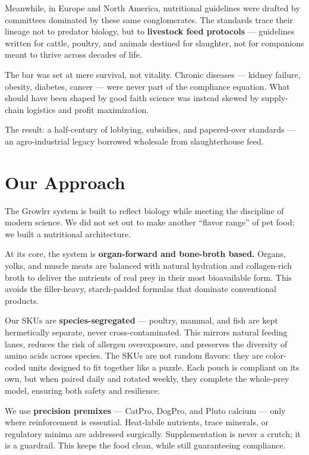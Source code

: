 Meanwhile, in Europe and North America, nutritional guidelines were drafted by committees dominated by these same conglomerates. The standards trace their lineage not to predator biology, but to \textbf{livestock feed protocols} --- guidelines written for cattle, poultry, and animals destined for slaughter\cite{ref70}, not for companions meant to thrive across decades of life.

The bar was set at mere survival, not vitality\cite{ref59}. Chronic diseases --- kidney failure, obesity, diabetes, cancer --- were never part of the compliance equation\cite{ref41}. What should have been shaped by good faith science was instead skewed by supply-chain logistics and profit maximization.

The result: a half-century of lobbying, subsidies, and papered-over standards\cite{ref71} --- an agro-industrial legacy borrowed wholesale from slaughterhouse feed.

\newpage
\section{Our Approach}

The Growlrr system is built to reflect biology while meeting the discipline of modern science. We did not set out to make another ``flavor range'' of pet food; we built a nutritional architecture.

At its core, the system is \textbf{organ-forward and bone-broth based.} Organs, yolks, and muscle meats are balanced with natural hydration and collagen-rich broth to deliver the nutrients of real prey in their most bioavailable form. This avoids the filler-heavy, starch-padded formulas that dominate conventional products.

Our SKUs are \textbf{species-segregated} --- poultry, mammal, and fish are kept hermetically separate, never cross-contaminated. This mirrors natural feeding lanes, reduces the risk of allergen overexposure, and preserves the diversity of amino acids across species. The SKUs are not random flavors: they are color-coded units designed to fit together like a puzzle. Each pouch is compliant on its own, but when paired daily and rotated weekly, they complete the whole-prey model, ensuring both safety and resilience.

We use \textbf{precision premixes} --- CatPro, DogPro, and Pluto calcium --- only where reinforcement is essential. Heat-labile nutrients, trace minerals, or regulatory minima are addressed surgically. Supplementation is never a crutch; it is a guardrail. This keeps the food clean, while still guaranteeing compliance.


